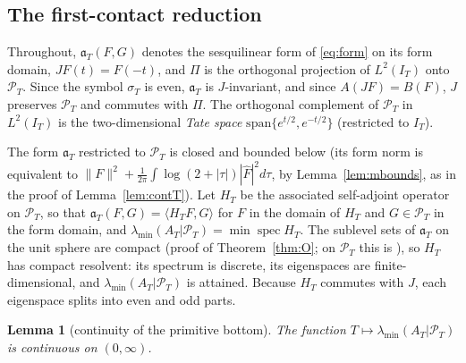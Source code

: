 \documentclass[11pt]{amsart}
\newtheorem{lemma}[theorem]{Lemma}
\theoremstyle{definition}
\theoremstyle{remark}
\newcommand{\PT}{\mathcal P_T}
\newcommand{\IT}{I_T}
\newcommand{\lamA}{\lambda_{\min}(A_T|\PT)}
\newcommand{\sT}{\sigma_T}
\newcommand{\Fh}{\widehat F}
\begin{document}
\subsection{The first-contact reduction}

Throughout, $\mathfrak a_T(F,G)$ denotes the sesquilinear form of \eqref{eq:form} on its form
domain, $J F(t)=F(-t)$, and $\Pi$ is the orthogonal projection of $L^2(\IT)$ onto $\PT$. Since the
symbol $\sT$ is even, $\mathfrak a_T$ is $J$-invariant, and since $A(JF)=B(F)$, $J$ preserves $\PT$
and commutes with $\Pi$. The orthogonal complement of $\PT$ in $L^2(\IT)$ is the two-dimensional
\emph{Tate space} $\mathrm{span}\{e^{t/2},e^{-t/2}\}$ (restricted to $\IT$).

The form $\mathfrak a_T$ restricted to $\PT$ is closed and bounded below (its form norm is
equivalent to $\|F\|^2+\frac1{2\pi}\int\log(2+|\tau|)|\Fh|^2d\tau$, by Lemma~\ref{lem:mbounds}, as in
the proof of Lemma~\ref{lem:contT}). Let $H_T$ be the associated self-adjoint operator on $\PT$, so
that $\mathfrak a_T(F,G)=\langle H_TF,G\rangle$ for $F$ in the domain of $H_T$ and $G\in\PT$ in the
form domain, and $\lamA=\min\operatorname{spec}H_T$. The sublevel sets of $\mathfrak a_T$ on the
unit sphere are compact (proof of Theorem~\ref{thm:O}; on $\PT$ this is
\cite[Thm.~3]{Bombieri2000}), so $H_T$ has compact resolvent: its spectrum is discrete, its
eigenspaces are finite-dimensional, and $\lamA$ is attained. Because $H_T$ commutes with $J$, each
eigenspace splits into even and odd parts.

\begin{lemma}[continuity of the primitive bottom]\label{lem:contA}
The function $T\mapsto\lamA$ is continuous on $(0,\infty)$.
\end{lemma}
\end{document}
